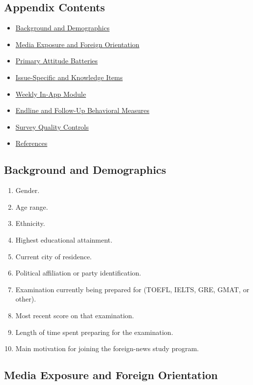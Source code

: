 \documentclass[12pt,american]{article}
\begin{document}
\subsection*{Appendix Contents}
\begin{itemize}
\item \hyperref[app:background]{Background and Demographics}
\item \hyperref[app:media]{Media Exposure and Foreign Orientation}
\item \hyperref[app:attitudes]{Primary Attitude Batteries}
\item \hyperref[app:knowledge]{Issue-Specific and Knowledge Items}
\item \hyperref[app:weekly]{Weekly In-App Module}
\item \hyperref[app:endline]{Endline and Follow-Up Behavioral Measures}
\item \hyperref[app:qc]{Survey Quality Controls}
\item \hyperref[app:refs]{References}
\end{itemize}

\subsection{Background and Demographics}\label{app:background}

\begin{enumerate}[label=\arabic*., leftmargin=1.5em]
\item Gender.
\item Age range.
\item Ethnicity.
\item Highest educational attainment.
\item Current city of residence.
\item Political affiliation or party identification.
\item Examination currently being prepared for (TOEFL, IELTS, GRE, GMAT, or other).
\item Most recent score on that examination.
\item Length of time spent preparing for the examination.
\item Main motivation for joining the foreign-news study program.
\end{enumerate}

\subsection{Media Exposure and Foreign Orientation}\label{app:media}
\end{document}
